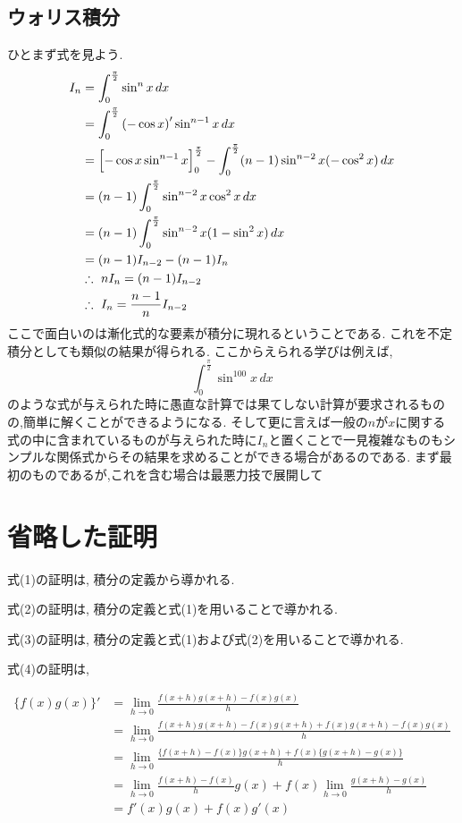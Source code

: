 ﻿\documentclass[dvipdfmx,a4paper,11pt,fleqn]{jsarticle}
\begin{document}
\subsection{ウォリス積分}
ひとまず式を見よう.
\begin{align*}
  I_{n} &=\displaystyle \int_{0}^{\frac{\pi}{2}}\sin^{n}x\,dx\\
  \displaystyle &=\int_{0}^{\frac{\pi}{2}}\left(-\cos x\right)'\sin^{n-1}x\,dx\\
  \displaystyle &=\Bigl[-\cos x\sin^{n-1}x\Bigr]_{0}^{\frac{\pi}{2}}-\int_{0}^{\frac{\pi}{2}}(n-1)\sin^{n-2}x(-\cos^{2} x)\,dx\\
  \displaystyle &=(n-1)\int_{0}^{\frac{\pi}{2}}\sin^{n-2}x\cos^{2}x\,dx\\
  \displaystyle &=(n-1)\int_{0}^{\frac{\pi}{2}}\sin^{n-2}x(1-\sin^{2}x)\,dx\\
  \displaystyle &=(n-1)I_{n-2}-(n-1)I_{n}\\
  & \therefore \ \displaystyle nI_{n}=(n-1)I_{n-2}\\
  & \therefore \ \displaystyle I_{n}=\frac{n-1}{n}I_{n-2}
\end{align*}
ここで面白いのは漸化式的な要素が積分に現れるということである.
これを不定積分としても類似の結果が得られる.
ここからえられる学びは例えば,
\[
\int_{0}^{\frac{\pi}{2}} \sin^{100} x \,dx
\]
のような式が与えられた時に愚直な計算では果てしない計算が要求されるものの,簡単に解くことができるようになる.
そして更に言えば一般の$n$が$x$に関する式の中に含まれているものが与えられた時に$I_n$と置くことで一見複雑なものもシンプルな関係式からその結果を求めることができる場合があるのである.
まず最初のものであるが,これを含む場合は最悪力技で展開して

\section{省略した証明}

式(1)の証明は, 積分の定義から導かれる.

式(2)の証明は, 積分の定義と式(1)を用いることで導かれる.

式(3)の証明は, 積分の定義と式(1)および式(2)を用いることで導かれる.

式(4)の証明は,

\begin{align*}
  \{f(x)g(x)\}'
  &=\lim_{h\to0}
  \frac{f(x+h)g(x+h)-f(x)g(x)}{h}\\
  &=\lim_{h\to0}
  \frac{
    f(x+h)g(x+h)-f(x)g(x+h)
    +f(x)g(x+h)-f(x)g(x)
  }{h}\\
  &=\lim_{h\to0}
  \frac{
    \{f(x+h)-f(x)\}g(x+h)
    +f(x)\{g(x+h)-g(x)\}
  }{h}\\
  &=\lim_{h\to0}
  \frac{f(x+h)-f(x)}{h}g(x)
  +f(x)\lim_{h\to0}
  \frac{g(x+h)-g(x)}{h}\\
  &=f'(x)g(x)+f(x)g'(x)
\end{align*}
\end{document}
